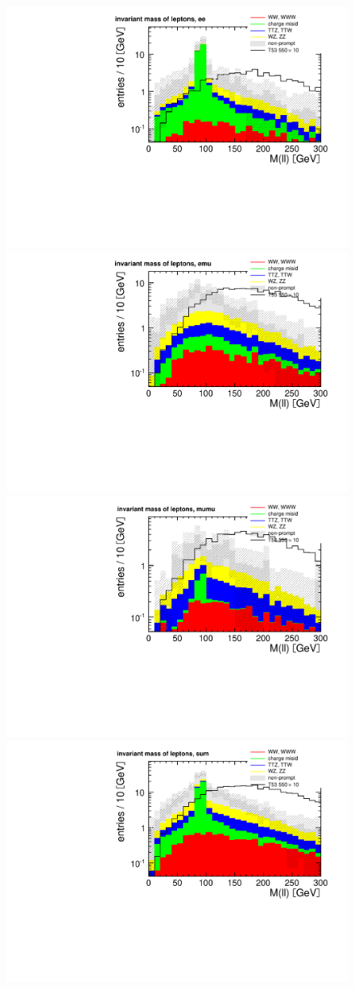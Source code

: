 \begin{figure}[htb]
    \centering
    \includegraphics[width=.7\textwidth]{images/pdf/lep_mass_ee_0}
    \includegraphics[width=.7\textwidth]{images/pdf/lep_mass_emu_0}
    \includegraphics[width=.7\textwidth]{images/pdf/lep_mass_mumu_0}
    \includegraphics[width=.7\textwidth]{images/pdf/lep_mass_sum_0}

\end{figure}
